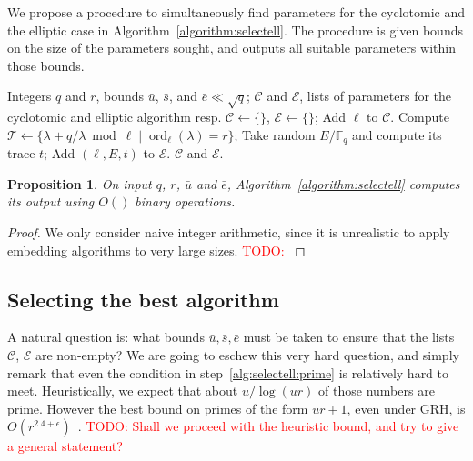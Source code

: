 \documentclass[12pt]{article}
\theoremstyle{plain}
\newtheorem{proposition}[theorem]{Proposition}
\theoremstyle{definition}
\newcommand{\todo}[1]{\textcolor{red}{TODO: #1}}
\DeclareMathOperator{\order}{ord} %
\def\F{\ensuremath{\mathbb{F}}}
\newcounter{algorithm}
\begin{document}
We propose a procedure to simultaneously find parameters for the
cyclotomic and the elliptic case in
Algorithm~\ref{algorithm:selectell}. The procedure is given bounds on
the size of the parameters sought, and outputs all suitable parameters
within those bounds.

\begin{algorithm}
    \label{algorithm:selectell}
    \begin{algorithmic}[1]
      \REQUIRE Integers $q$ and $r$, bounds $\bar{u}$, $\bar{s}$, and $\bar{e}\ll\sqrt{q}$;
      \ENSURE $\mathcal{C}$ and $\mathcal{E}$, lists of parameters for the cyclotomic and elliptic algorithm resp.
      \STATE $\mathcal{C}\leftarrow\{\}$, $\mathcal{E}\leftarrow\{\}$;
      \IF{$\order_\ell(q)=rs$ with $s\le\bar{s}$ and $\gcd(rs,u/s)=1$}
      \STATE Add $\ell$ to $\mathcal{C}$.
      \ENDIF
      \STATE Compute $\mathcal{T} \leftarrow \{\lambda + q/\lambda \bmod\ell \;|\; \order_\ell(\lambda)=r\}$;
      \REPEAT
      \STATE Take random $E/\F_q$ and compute its trace $t$;
      \STATE Add $(\ell,E,t)$ to $\mathcal{E}$.
      \ENDIF
      \ENDIF
      \ENDFOR
      \RETURN $\mathcal{C}$ and $\mathcal{E}$.
    \end{algorithmic}
\end{algorithm}

\begin{proposition}
  On input $q$, $r$, $\bar{u}$ and $\bar{e}$,
  Algorithm~\ref{algorithm:selectell} computes its output using $O()$
  binary operations.
\end{proposition}
\begin{proof}
  We only consider naive integer arithmetic, since it is unrealistic
  to apply embedding algorithms to very large sizes. \todo{}
\end{proof}

\subsection{Selecting the best algorithm}

A natural question is: what bounds $\bar{u},\bar{s},\bar{e}$ must be
taken to ensure that the lists $\mathcal{C}$, $\mathcal{E}$ are
non-empty? We are going to eschew this very hard question, and simply
remark that even the condition in step~\ref{alg:selectell:prime} is
relatively hard to meet. Heuristically, we expect that about
$u/\log(ur)$ of those numbers are prime. However the best bound on
primes of the form $ur+1$, even under GRH, is
$O(r^{2.4+\epsilon})$~\cite{heath1992zero}. \todo{Shall we proceed
  with the heuristic bound, and try to give a general statement?}
\end{document}
